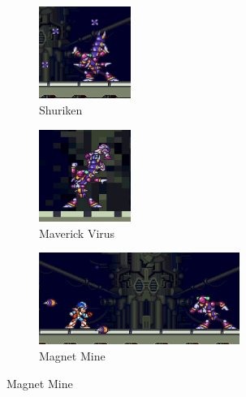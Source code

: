 \begin{figure}[htp]
	\centering
	\begin{subfigure}{0.3\linewidth}
		\centering
		\includegraphics[height=3cm]{figures/X2/Magna_centipede/Centipede_shuriken.png}
		\caption{Shuriken}
	\end{subfigure}
	\begin{subfigure}{0.3\linewidth}
		\centering
		\includegraphics[height=3cm]{figures/X2/Magna_centipede/Centipede_injection.png}
		\caption{Maverick Virus}
	\end{subfigure}
	\begin{subfigure}{\linewidth}
		\centering
		\includegraphics[height= 3cm]{figures/X2/Magna_centipede/Centipede_magnet.png}
		\caption{Magnet Mine}
	\end{subfigure}
\end{figure}

